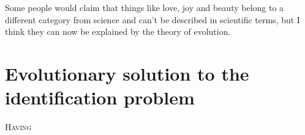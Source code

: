 
\begin{savequote}[99mm]
Some people would claim that things like love, joy and beauty belong to a different category from science and can't be described in scientific terms, but I think they can now be explained by the theory of evolution.
\end{savequote}

\chapter{Evolutionary solution to the identification problem}

\label{chap:id-bin}
\lettrine[lines=5, loversize=-0.1, lraise=0.1]{H}{aving} 
